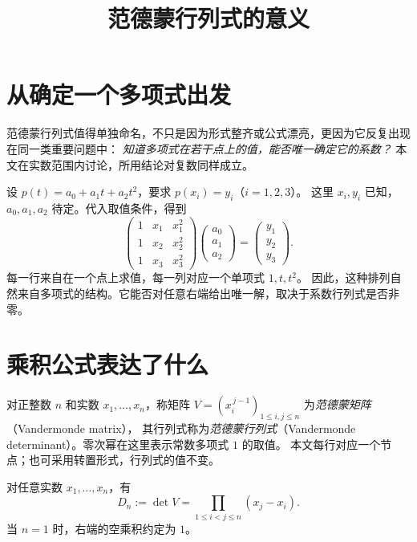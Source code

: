 \documentclass[UTF8,12pt,a4paper,fontset=fandol]{ctexart}
\title{范德蒙行列式的意义}
\author{}
\date{}
\begin{document}
\maketitle

\section{从确定一个多项式出发}

范德蒙行列式值得单独命名，不只是因为形式整齐或公式漂亮，更因为它反复出现在同一类重要问题中：
\emph{知道多项式在若干点上的值，能否唯一确定它的系数？}
本文在实数范围内讨论，所用结论对复数同样成立。

设 $p(t)=a_0+a_1t+a_2t^2$，要求 $p(x_i)=y_i$（$i=1,2,3$）。
这里 $x_i,y_i$ 已知，$a_0,a_1,a_2$ 待定。代入取值条件，得到
\[
  \begin{pmatrix}
    1&x_1&x_1^2\\
    1&x_2&x_2^2\\
    1&x_3&x_3^2
  \end{pmatrix}
  \begin{pmatrix}a_0\\a_1\\a_2\end{pmatrix}
  =\begin{pmatrix}y_1\\y_2\\y_3\end{pmatrix}.
\]
每一行来自在一个点上求值，每一列对应一个单项式 $1,t,t^2$。
因此，这种排列自然来自多项式的结构。它能否对任意右端给出唯一解，取决于系数行列式是否非零。

\section{乘积公式表达了什么}

对正整数 $n$ 和实数 $x_1,\ldots,x_n$，称矩阵
$V=(x_i^{\,j-1})_{1\leq i,j\leq n}$ 为\emph{范德蒙矩阵}（Vandermonde matrix），
其行列式称为\emph{范德蒙行列式}（Vandermonde determinant）。零次幂在这里表示常数多项式 $1$ 的取值。
本文每行对应一个节点；也可采用转置形式，行列式的值不变。

\begin{theorem}[范德蒙行列式公式]
\label{thm:meaning-product}
对任意实数 $x_1,\ldots,x_n$，有
\begin{equation}
  D_n:=\det V=\prod_{1\leq i<j\leq n}(x_j-x_i).
  \label{eq:meaning-product}
\end{equation}
当 $n=1$ 时，右端的空乘积约定为 $1$。
\end{theorem}
\end{document}
